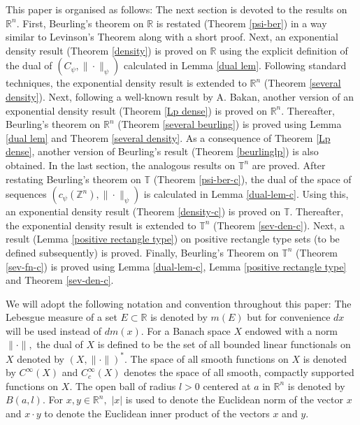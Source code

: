 \documentclass [11pt]{amsart}
\newcommand{\R}{\mathbb R}
\newcommand{\T}{\mathbb T}
\newcommand{\Z}{\mathbb Z}
\numberwithin{equation}{section}
\begin{document}
This paper is organised as follows: The next section is devoted to the results on $\R^n.$ First, Beurling's theorem on $\R$ is restated (Theorem \ref{psi-ber}) in a way similar to Levinson's Theorem along with a short proof. Next, an exponential density result (Theorem \ref{density}) is proved on $\R$ using the explicit definition of the dual of $(C_\psi, \|\cdot\|_\psi)$ calculated in Lemma \ref{dual lem}. Following standard techniques, the exponential density result is extended to $\R^n$ (Theorem \ref{several density}). Next, following a well-known result by A. Bakan, another version of an exponential density result (Theorem \ref{Lp dense}) is proved on $\R^n.$ Thereafter, Beurling's theorem on $\R^n$ (Theorem \ref{several beurling}) is proved using Lemma \ref{dual lem} and Theorem \ref{several density}. As a consequence of Theorem \ref{Lp dense}, another version of Beurling's result (Theorem \ref{beurlinglp}) is also obtained. In the last section, the analogous results on $\T^n$ are proved. After restating Beurling's theorem on $\T$ (Theorem \ref{psi-ber-c}), the dual of the space of sequences $(c_\psi(\Z^n), \|\cdot\|_\psi)$ is calculated in Lemma \ref{dual-lem-c}. Using this, an exponential density result (Theorem \ref{density-c}) is proved on $\T.$ Thereafter, the exponential density result is extended to $\T^n$ (Theorem \ref{sev-den-c}). Next, a result (Lemma \ref{positive rectangle type}) on positive rectangle type sets (to be defined subsequently) is proved. Finally, Beurling's Theorem on $\T^n$ (Theorem \ref{sev-fn-c}) is proved using Lemma \ref{dual-lem-c}, Lemma \ref{positive rectangle type} and Theorem \ref{sev-den-c}. 

We will adopt the following notation and convention throughout this paper: 
The Lebesgue measure of a set $E\subset \R$ is denoted by $m(E)$ but for convenience $dx$ will be used instead of $dm(x).$ For a Banach space $X$ endowed with a norm $\|\cdot\|,$ the dual of $X$ is defined to be the set of all bounded linear functionals on $X$ denoted by $(X,\|\cdot\|)^*.$ The space of all smooth functions on $X$ is denoted by $C^\infty(X)$ and $C_c^\infty(X)$ denotes the space of all smooth, compactly supported functions on $X.$ The open ball of radius $l>0$ centered at $a$ in $\R^n$ is denoted by $B(a,l).$ For $x, y \in \R^n,$ $|x|$ is used to denote the Euclidean norm of the vector $x$ and $x \cdot y$ to denote the Euclidean inner product of the vectors $x$ and $y.$
\end{document}
